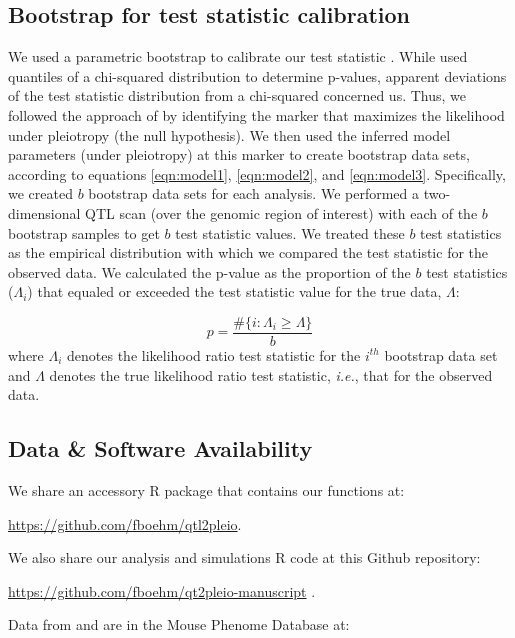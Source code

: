 \documentclass[12pt,twoside, lineno]{gsajnl}
\begin{document}
\subsection{Bootstrap for test statistic calibration}

We used a parametric bootstrap to calibrate our test statistic \citep{efron1979}. While \citet{jiang1995multiple} used quantiles of a chi-squared distribution to determine p-values, apparent deviations of the test statistic distribution from a chi-squared concerned us. Thus, we followed the approach of \citet{tian2016dissection} by identifying the marker that maximizes the likelihood under pleiotropy (the null hypothesis). We then used the inferred model parameters (under pleiotropy) at this marker to create bootstrap data sets, according to equations \ref{eqn:model1}, \ref{eqn:model2}, and \ref{eqn:model3}. Specifically, we created $b$ bootstrap data sets for each analysis. We performed a two-dimensional QTL scan (over the genomic region of interest) with each of the $b$ bootstrap samples to get $b$ test statistic values. We treated these $b$ test statistics as the empirical distribution with which we compared the test statistic for the observed data. We calculated the p-value as the proportion of the $b$ test statistics ($\Lambda_i$) that equaled or exceeded the test statistic value for the true data, $\Lambda$:

\begin{equation}
p = \frac{\# \lbrace i:\Lambda_i \geq \Lambda\rbrace}{b}
\end{equation}
where $\Lambda_{i}$ denotes the likelihood ratio test statistic for the $i^{th}$ bootstrap data set and $\Lambda$ denotes the true likelihood ratio test statistic, \textit{i.e.}, that for the observed data.

\subsection{Data \& Software Availability}


We share an accessory R package that contains our functions at:

\href{https://github.com/fboehm/qtl2pleio}{https://github.com/fboehm/qtl2pleio}.

\noindent We also share our analysis and simulations R code at this Github repository:

\href{https://github.com/fboehm/qt2pleio-manuscript}{https://github.com/fboehm/qt2pleio-manuscript} \citep{r}.

\noindent Data from \citet{recla2014precise} and \citet{logan2013high} are in the Mouse Phenome Database at:
\end{document}

